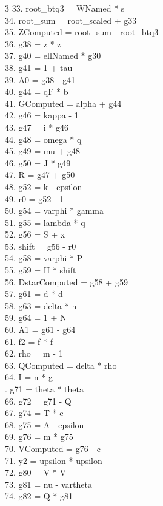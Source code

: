 \documentclass[10pt]{article}
\begin{document}
\begin{multicols}{3}
33. root\_btq3 = WNamed * s\\
34. root\_sum = root\_scaled + g33\\
35. ZComputed = root\_sum - root\_btq3\\
36. g38 = z * z\\
37. g40 = ellNamed * g30\\
38. g41 = 1 + tau\\
39. A0 = g38 - g41\\
40. g44 = qF * b\\
41. GComputed = alpha + g44\\
42. g46 = kappa - 1\\
43. g47 = i * g46\\
44. g48 = omega * q\\
45. g49 = mu + g48\\
46. g50 = J * g49\\
47. R = g47 + g50\\
48. g52 = k - epsilon\\
49. r0 = g52 - 1\\
50. g54 = varphi * gamma\\
51. g55 = lambda * q\\
52. g56 = S + x\\
53. shift = g56 - r0\\
54. g58 = varphi * P\\
55. g59 = H * shift\\
56. DstarComputed = g58 + g59\\
57. g61 = d * d\\
58. g63 = delta * n\\
59. g64 = 1 + N\\
60. A1 = g61 - g64\\
61. f2 = f * f\\
62. rho = m - 1\\
63. QComputed = delta * rho\\
64. I = n * g\\
. g71 = theta * theta\\
66. g72 = g71 - Q\\
67. g74 = T * c\\
68. g75 = A - epsilon\\
69. g76 = m * g75\\
70. VComputed = g76 - c\\
71. y2 = upsilon * upsilon\\
72. g80 = V * V\\
73. g81 = nu - vartheta\\
74. g82 = Q * g81\\

\end{multicols}
\end{document}
